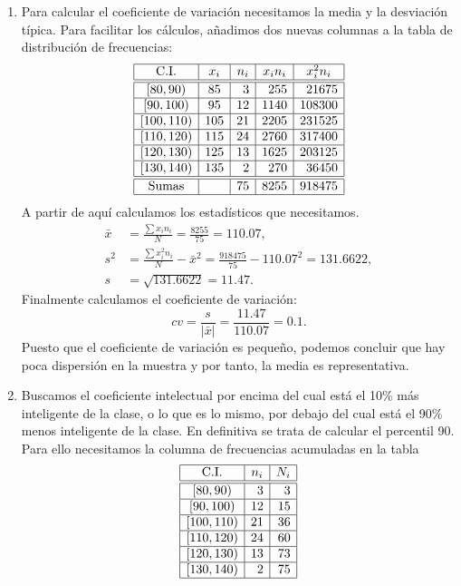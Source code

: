 {\begin{enumerate}
\item Para calcular el coeficiente de variación necesitamos la media y la desviación típica.
Para facilitar los cálculos, añadimos dos nuevas columnas a la tabla de distribución de frecuencias:
\[
\begin{array}{|c|c|r|r|r|}
\hline
   \textrm{C.I.}   & x_i & \multicolumn{1}{c|}{n_i} & \multicolumn{1}{c|}{x_in_i} & \multicolumn{1}{c|}{x_i^2n_i}\\
\hline\hline
  [80,90)  &  85  &   3       & 255 & 21675 \\
\hline
 [90,100)  &  95 &    12       & 1140 & 108300 \\
\hline
 [100,110) &  105 &    21       & 2205 & 231525\\
\hline
 [110,120) &  115 &    24       & 2760 & 317400\\
\hline
 [120,130) &  125 &    13       & 1625 & 203125\\
\hline
 [130,140) &  135 &     2       & 270 & 36450\\
\hline\hline
 \textrm{Sumas} &  & 75 & 8255 & 918475 \\
\hline
\end{array}
\]
A partir de aquí calculamos los estadísticos que necesitamos.
\begin{align*}
\bar{x} & = \frac{\sum x_in_i}{N}=\frac{8255}{75}=110.07,\\
s^2 & =\frac{\sum x_i^2n_i}{N}-\bar{x}^2= \frac{918475}{75}-110.07^2=131.6622,\\
s & =\sqrt{131.6622}=11.47.
\end{align*}
Finalmente calculamos el coeficiente de variación:
\[
cv=\frac{s}{|\bar{x}|}=\frac{11.47}{110.07}= 0.1.
\]
Puesto que el coeficiente de variación es pequeño, podemos concluir que hay poca dispersión en la muestra y por tanto, la media es representativa.

\item Buscamos el coeficiente intelectual por encima del cual está el 10\% más inteligente de la clase, o lo que es lo mismo, por debajo del cual está el 90\% menos inteligente de la clase. En definitiva se trata de calcular el percentil 90.
Para ello necesitamos la columna de frecuencias acumuladas en la tabla
\[
\begin{array}{|c|r|r|}
\hline
   \textrm{C.I.}    & \multicolumn{1}{c|}{n_i} & \multicolumn{1}{c|}{N_i} \\
\hline\hline
  [80,90)  &       3       & 3 \\
\hline
 [90,100)  &      12       & 15 \\
\hline
 [100,110) &      21       & 36 \\
\hline
 [110,120) &      24       & 60 \\
\hline
 [120,130) &      13       & 73 \\
\hline
 [130,140) &       2       & 75 \\
\hline
\end{array}
\]


\end{enumerate}}
